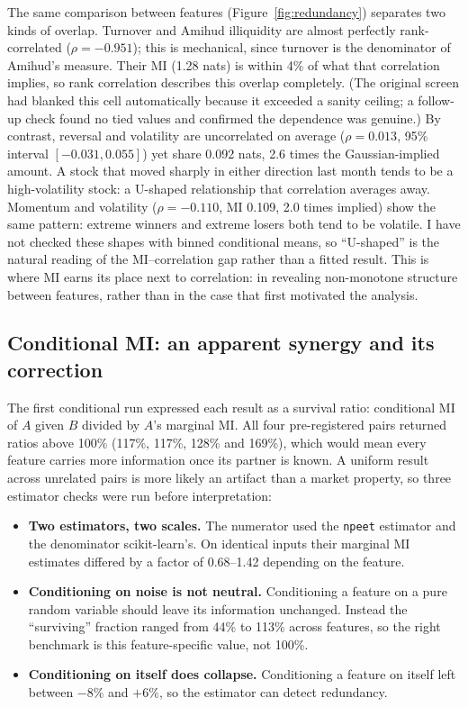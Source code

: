 \documentclass[11pt]{article}
\begin{document}
The same comparison between features (Figure~\ref{fig:redundancy}) separates two kinds
of overlap. Turnover and Amihud illiquidity are almost perfectly rank-correlated
($\rho = -0.951$); this is mechanical, since turnover is the denominator of Amihud's
measure. Their MI (1.28 nats) is within 4\% of what that correlation implies, so rank
correlation describes this overlap completely. (The original screen had blanked this
cell automatically because it exceeded a sanity ceiling; a follow-up check found no
tied values and confirmed the dependence was genuine.) By contrast, reversal and
volatility are uncorrelated on average ($\rho = 0.013$, 95\% interval
$[-0.031, 0.055]$) yet share 0.092 nats, 2.6 times the Gaussian-implied amount. A stock
that moved sharply in either direction last month tends to be a high-volatility stock:
a U-shaped relationship that correlation averages away. Momentum and volatility
($\rho = -0.110$, MI 0.109, 2.0 times implied) show the same pattern: extreme winners
and extreme losers both tend to be volatile. I have not checked these shapes with
binned conditional means, so ``U-shaped'' is the natural reading of the MI--correlation
gap rather than a fitted result. This is where MI earns its place next to correlation:
in revealing non-monotone structure between features, rather than in the case that
first motivated the analysis.

\subsection{Conditional MI: an apparent synergy and its correction}
\label{sec:cmi}

The first conditional run expressed each result as a survival ratio: conditional MI of
$A$ given $B$ divided by $A$'s marginal MI. All four pre-registered pairs returned
ratios above 100\% (117\%, 117\%, 128\% and 169\%), which would mean every feature
carries more information once its partner is known. A uniform result across unrelated
pairs is more likely an artifact than a market property, so three estimator checks
were run before interpretation:

\begin{itemize}
\item \textbf{Two estimators, two scales.} The numerator used the \texttt{npeet}
estimator and the denominator scikit-learn's. On identical inputs their marginal MI
estimates differed by a factor of 0.68--1.42 depending on the feature.
\item \textbf{Conditioning on noise is not neutral.} Conditioning a feature on a pure
random variable should leave its information unchanged. Instead the ``surviving''
fraction ranged from 44\% to 113\% across features, so the right benchmark is this
feature-specific value, not 100\%.
\item \textbf{Conditioning on itself does collapse.} Conditioning a feature on itself
left between $-8\%$ and $+6\%$, so the estimator can detect redundancy.
\end{itemize}
\end{document}
